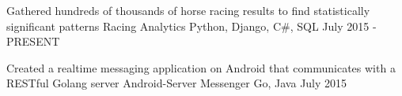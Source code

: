 

\begin{cventries}

  \cvsimpleentry
    {Gathered hundreds of thousands of horse racing results to find statistically significant patterns} %
    {Racing Analytics} %
    {Python, Django, C\#, SQL} %
    {July 2015 - PRESENT} %

  \cvsimpleentry
    {Created a realtime messaging application on Android that communicates with a RESTful Golang server} %
    {Android-Server Messenger} %
    {Go, Java} %
    {July 2015} %

\end{cventries}

